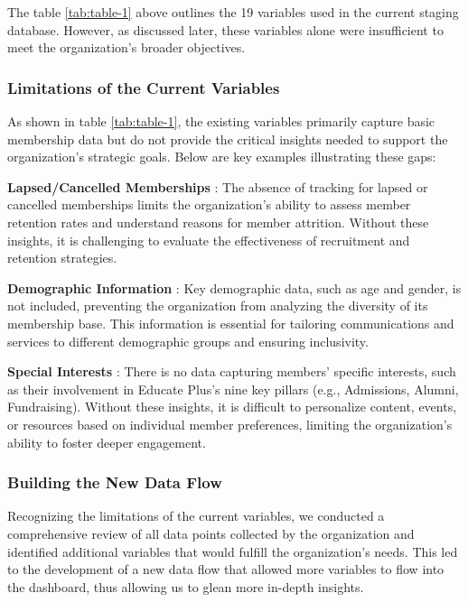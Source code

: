 \documentclass[11pt,a4paper,]{article}
\begin{document}
The table \ref{tab:table-1} above outlines the 19 variables used in the current staging database. However, as discussed later, these variables alone were insufficient to meet the organization's broader objectives.

\subsubsection{Limitations of the Current Variables}\label{limitations-of-the-current-variables}

As shown in table \ref{tab:table-1}, the existing variables primarily capture basic membership data but do not provide the critical insights needed to support the organization's strategic goals. Below are key examples illustrating these gaps:

\textbf{Lapsed/Cancelled Memberships} : The absence of tracking for lapsed or cancelled memberships limits the organization's ability to assess member retention rates and understand reasons for member attrition. Without these insights, it is challenging to evaluate the effectiveness of recruitment and retention strategies.

\textbf{Demographic Information} : Key demographic data, such as age and gender, is not included, preventing the organization from analyzing the diversity of its membership base. This information is essential for tailoring communications and services to different demographic groups and ensuring inclusivity.

\textbf{Special Interests} : There is no data capturing members' specific interests, such as their involvement in Educate Plus's nine key pillars (e.g., Admissions, Alumni, Fundraising). Without these insights, it is difficult to personalize content, events, or resources based on individual member preferences, limiting the organization's ability to foster deeper engagement.

\subsubsection{Building the New Data Flow}\label{building-the-new-data-flow}

Recognizing the limitations of the current variables, we conducted a comprehensive review of all data points collected by the organization and identified additional variables that would fulfill the organization's needs. This led to the development of a new data flow that allowed more variables to flow into the dashboard, thus allowing us to glean more in-depth insights.
\end{document}
